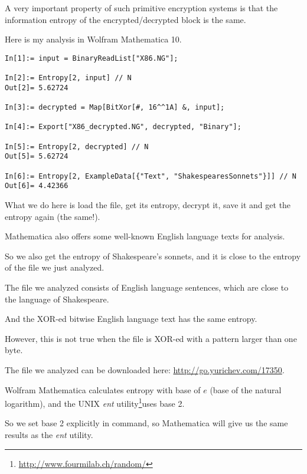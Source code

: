 A very important property of such primitive encryption systems is that the information entropy
of the encrypted/decrypted block is the same.

Here is my analysis in Wolfram Mathematica 10.

\begin{lstlisting}[caption=Wolfram Mathematica 10,style=custommath]
In[1]:= input = BinaryReadList["X86.NG"];

In[2]:= Entropy[2, input] // N
Out[2]= 5.62724

In[3]:= decrypted = Map[BitXor[#, 16^^1A] &, input];

In[4]:= Export["X86_decrypted.NG", decrypted, "Binary"];

In[5]:= Entropy[2, decrypted] // N
Out[5]= 5.62724

In[6]:= Entropy[2, ExampleData[{"Text", "ShakespearesSonnets"}]] // N
Out[6]= 4.42366
\end{lstlisting}

What we do here is load the file, get its entropy, decrypt it, save it and get the entropy again (the same!).

Mathematica also offers some well-known English language texts for analysis.

So we also get the entropy of Shakespeare's sonnets, and it is close to the entropy of the file we just analyzed.

The file we analyzed consists of English language sentences, which are close to the language 
of Shakespeare.

And the XOR-ed bitwise English language text has the same entropy.

However, this is not true when the file is XOR-ed with a pattern larger than one byte.

The file we analyzed can be downloaded here: \url{http://go.yurichev.com/17350}.


\newcommand{\FNENTURL}{\footnote{\url{http://www.fourmilab.ch/random/}}}

Wolfram Mathematica calculates entropy with base of $e$ (base of the natural logarithm),
and the UNIX \emph{ent} utility\FNENTURL uses base 2.

So we set base 2 explicitly in  command, so Mathematica will give us the same results as the \emph{ent} utility.

